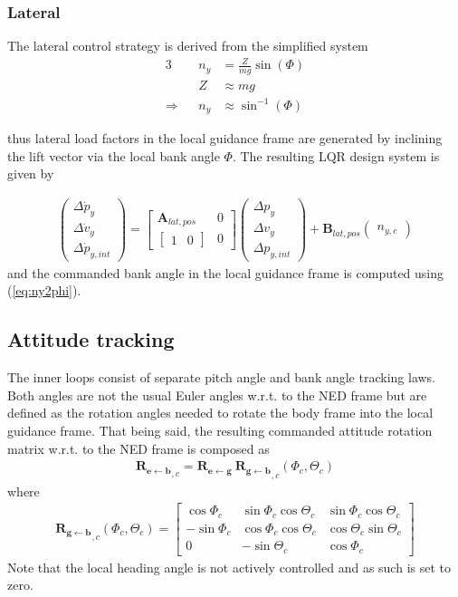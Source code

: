 \documentclass{ifacconf}
\newcommand{\mbf}[1]{\mathbf{#1}}
\providecommand{\mbf}[1]{\mathbf{#1}}
\newcommand{\Reb}{{\ensuremath{\mbf{R_{e\leftarrow  b}}}}}
\newcommand{\Reg}{{\ensuremath{\mbf{R_{e\leftarrow  g}}}}}
\newcommand{\Rgb}{{\ensuremath{\mbf{R_{g\leftarrow  b}}}}}
\begin{document}
\subsubsection{Lateral}
The lateral control strategy is derived from the simplified system
\begin{alignat}{3}
{} &&n_y &= \frac{Z}{m g} \sin(\Phi) \\
{} &&Z   &\approx m g \\
\Rightarrow &&n_y &\approx \sin^{-1}(\Phi) \label{eq:ny2phi}
\end{alignat}

thus lateral load factors in the local guidance frame are generated by inclining the lift vector via the local bank angle $\Phi$. The resulting LQR design system is given by

\begin{align}
\begin{pmatrix}
\Delta \dot{p}_y \\
\Delta \dot{v}_y \\
\Delta \dot{p}_{y,int} 
\end{pmatrix}
=
\begin{bmatrix}
\mbf{
A
}_{lat, pos} 
& 
0
\\
\begin{bmatrix}
1 & 0
\end{bmatrix}
& 
0
\end{bmatrix}
\begin{pmatrix}
\Delta {p}_y \\
\Delta {v}_y \\
\Delta {p}_{y,int} 
\end{pmatrix}
+
\mbf{
B
}_{lat, pos}
\begin{pmatrix}
n_{y,c}
\end{pmatrix}
\end{align}
and the commanded bank angle in the local guidance frame is computed using  (\ref{eq:ny2phi}).

\subsection{Attitude tracking}
The inner loops consist of separate pitch angle and bank angle tracking laws. Both angles are not the usual Euler angles w.r.t. to the NED frame but are defined as the rotation angles needed to rotate the body frame into the local guidance frame. That being said, the resulting commanded attitude rotation matrix w.r.t. to the NED frame is composed as
\begin{align}
\Reb_{,c} 
= 
\Reg \: \Rgb_{,c} (\Phi_c, \Theta_c)
\end{align}
where
\begin{align}
\Rgb_{,c} (\Phi_c, \Theta_c)
= 
\begin{bmatrix}
\cos \Phi_c &  \sin \Phi_c \cos \Theta_c & \sin \Phi_c \cos \Theta_c \\
-\sin \Phi_c& \cos \Phi_c \cos \Theta_c  & \cos \Theta_c \sin  \Theta_c \\
0 & -\sin \Theta_c & \cos \Phi_c
\end{bmatrix}
\end{align}
Note that the local heading angle is not actively controlled and as such is set to zero.
\end{document}

